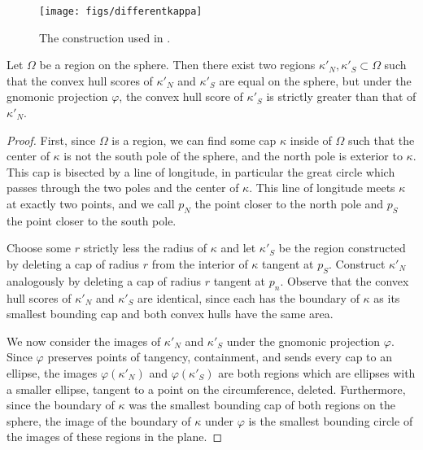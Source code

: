 \begin{figure}
	\centering
	\texttt{[image: figs/differentkappa]}\\[1.5em]
	\caption{ The construction used in . }
	\label{fig:caphr}
\end{figure}

\begin{theorem}
  \label{thm:convhull}
  Let $\Omega$ be a region on the sphere.  Then there exist two regions
  $\kappa'_N,\kappa'_S\subset \Omega$ such that the convex hull scores of
  $\kappa'_N$ and $\kappa'_S$ are equal on the sphere, but under the
  gnomonic projection $\varphi$, the convex hull score of $\kappa'_S$ is
strictly greater than that of $\kappa'_N$.  
\end{theorem}

\begin{proof}
  First, since $\Omega$ is a region, we can find some cap $\kappa$ inside
  of $\Omega$ such that the center of $\kappa$ is not the south pole of the
  sphere, and the north pole is exterior to $\kappa$.  This cap is
  bisected by a line of longitude, in particular the great circle
  which passes through the two poles and the center of $\kappa$.  This
  line of longitude meets $\kappa$ at exactly two points, and we call
  $p_N$ the point closer to the north pole and $p_S$ the point closer
  to the south pole.

  Choose some $r$ strictly less the radius of $\kappa$ and let
  $\kappa'_S$ be the region constructed by deleting a cap of radius
  $r$ from the interior of $\kappa$ tangent at $p_S$.  Construct
  $\kappa'_N$ analogously by deleting a cap of radius $r$ tangent at
  $p_n$. Observe that the convex hull scores of $\kappa'_N$ and
  $\kappa'_S$ are identical, since each has the boundary of $\kappa$
  as its smallest bounding cap and both convex hulls have the same
  area.

  We now consider the images of $\kappa'_N$ and $\kappa'_S$ under the
  gnomonic projection $\varphi$.  Since $\varphi$ preserves points of
  tangency, containment, and sends every cap to an ellipse, the images
  $\varphi(\kappa'_N)$ and $\varphi(\kappa'_S)$ are both regions which
  are ellipses with a smaller ellipse, tangent to a point on the
  circumference, deleted.  Furthermore, since the boundary of $\kappa$
  was the smallest bounding cap of both regions on the sphere, the
  image of the boundary of $\kappa$ under $\varphi$ is the smallest
  bounding circle of the images of these regions in the plane.


\end{proof}
